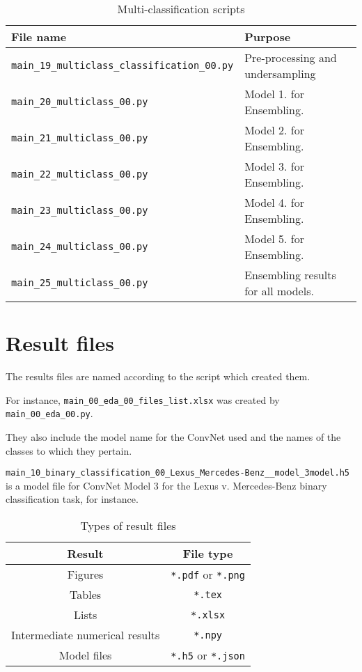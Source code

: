 \documentclass[12pt]{article}
\begin{document}
\begin{table}[H]
	\caption{Multi-classification scripts} \label{table:scripts:multi}
	\centering
	\begin{adjustbox}{max width=\textwidth}
		\begin{tabular}{| l | l | }
			\hline
			\textbf{File name} & \textbf{Purpose} \\
			\hline \hline
			\verb|main_19_multiclass_classification_00.py| & Pre-processing and undersampling \\ \hline 
			\verb|main_20_multiclass_00.py| & Model 1. for Ensembling. \\ \hline
		\verb|main_21_multiclass_00.py| & Model 2. for Ensembling. \\ \hline
		\verb|main_22_multiclass_00.py| & Model 3. for Ensembling. \\ \hline
			\verb|main_23_multiclass_00.py| & Model 4. for Ensembling. \\ \hline
			\verb|main_24_multiclass_00.py| & Model 5. for Ensembling. \\ \hline
			\verb|main_25_multiclass_00.py| & Ensembling results for all models. \\ \hline
			\hline
		\end{tabular}%
	\end{adjustbox}
\end{table}


\section{Result files}
The results files are named according to the script which created them. 

For instance, \verb|main_00_eda_00_files_list.xlsx| was created by \verb|main_00_eda_00.py|.

They also include the model name for the ConvNet used and the names of the classes to which they pertain.

\verb|main_10_binary_classification_00_Lexus_Mercedes-Benz__model_3model.h5| is a model file for ConvNet Model 3 for the Lexus v. Mercedes-Benz binary classification task, for instance.

\begin{table}[ht]
	\caption{Types of result files} \label{table:files}
	\centering
	\begin{tabular}{| c | c | }
		\hline
		\textbf{Result} & \textbf{File type} \\
		\hline \hline
		Figures &  \verb|*.pdf| or \verb|*.png| \\ \hline 
		Tables &  \verb|*.tex| \\ \hline 
		Lists &  \verb|*.xlsx|  \\ \hline 
		Intermediate numerical results &  \verb|*.npy|  \\ \hline
		Model files & \verb|*.h5| or \verb|*.json| \\
		\hline
	\end{tabular}
\end{table}
\end{document}
